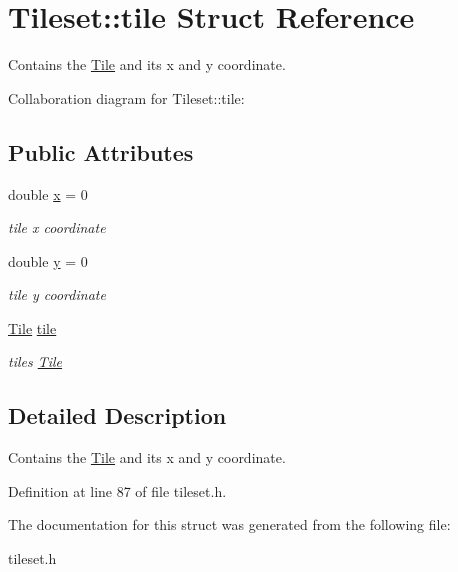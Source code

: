 \hypertarget{structTileset_1_1tile}{}\section{Tileset\+:\+:tile Struct Reference}
\label{structTileset_1_1tile}


Contains the \hyperlink{classTile}{Tile} and its x and y coordinate.  




Collaboration diagram for Tileset\+:\+:tile\+:
\subsection*{Public Attributes}
\begin{DoxyCompactItemize}
\item 
double \hyperlink{structTileset_1_1tile_a1ef99a135c4524cdb6074f4f465e11fb}{x} = 0\hypertarget{structTileset_1_1tile_a1ef99a135c4524cdb6074f4f465e11fb}{}\label{structTileset_1_1tile_a1ef99a135c4524cdb6074f4f465e11fb}

\begin{DoxyCompactList}\small\item\em tile x coordinate \end{DoxyCompactList}\item 
double \hyperlink{structTileset_1_1tile_af375f25f2d48ed50fc5ce94f382d0f1e}{y} = 0\hypertarget{structTileset_1_1tile_af375f25f2d48ed50fc5ce94f382d0f1e}{}\label{structTileset_1_1tile_af375f25f2d48ed50fc5ce94f382d0f1e}

\begin{DoxyCompactList}\small\item\em tile y coordinate \end{DoxyCompactList}\item 
\hyperlink{classTile}{Tile} \hyperlink{structTileset_1_1tile_a31c903cd12d0f061e2e0c7b8c3577153}{tile}\hypertarget{structTileset_1_1tile_a31c903cd12d0f061e2e0c7b8c3577153}{}\label{structTileset_1_1tile_a31c903cd12d0f061e2e0c7b8c3577153}

\begin{DoxyCompactList}\small\item\em tile\textquotesingle{}s \hyperlink{classTile}{Tile} \end{DoxyCompactList}\end{DoxyCompactItemize}


\subsection{Detailed Description}
Contains the \hyperlink{classTile}{Tile} and its x and y coordinate. 

Definition at line 87 of file tileset.\+h.



The documentation for this struct was generated from the following file\+:\begin{DoxyCompactItemize}
\item 
tileset.\+h\end{DoxyCompactItemize}
